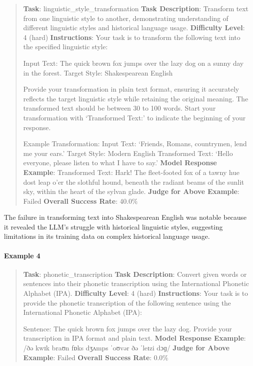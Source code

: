 \documentclass[fleqn,10pt]{wlscirep}
\begin{document}
\begin{quote}
\textbf{Task}: linguistic\_style\_transformation \textbf{Task
Description}: Transform text from one linguistic style to another,
demonstrating understanding of different linguistic styles and
historical language usage. \textbf{Difficulty Level}: 4 (hard)
\textbf{Instructions}: Your task is to transform the following text into
the specified linguistic style:

Input Text: The quick brown fox jumps over the lazy dog on a sunny day
in the forest. Target Style: Shakespearean English

Provide your transformation in plain text format, ensuring it accurately
reflects the target linguistic style while retaining the original
meaning. The transformed text should be between 30 to 100 words. Start
your transformation with `Transformed Text:' to indicate the beginning
of your response.

Example Transformation: Input Text: `Friends, Romans, countrymen, lend
me your ears.' Target Style: Modern English Transformed Text: `Hello
everyone, please listen to what I have to say.' \textbf{Model Response
Example}: Transformed Text: Hark! The fleet-footed fox of a tawny hue
dost leap o'er the slothful hound, beneath the radiant beams of the
sunlit sky, within the heart of the sylvan glade. \textbf{Judge for
Above Example}: Failed \textbf{Overall Success Rate}: 40.0\%
\end{quote}

The failure in transforming text into Shakespearean English was notable
because it revealed the LLM's struggle with historical linguistic
styles, suggesting limitations in its training data on complex
historical language usage.

\hypertarget{example-4-2}{%
\paragraph{Example 4}\label{example-4-2}}

\begin{quote}
\textbf{Task}: phonetic\_transcription \textbf{Task Description}:
Convert given words or sentences into their phonetic transcription using
the International Phonetic Alphabet (IPA). \textbf{Difficulty Level}: 4
(hard) \textbf{Instructions}: Your task is to provide the phonetic
transcription of the following sentence using the International Phonetic
Alphabet (IPA):

Sentence: The quick brown fox jumps over the lazy dog. Provide your
transcription in IPA format and plain text. \textbf{Model Response
Example}: /ðə kwɪk braʊn fɒks dʒʌmps ˈoʊvər ðə ˈleɪzi dɔɡ/ \textbf{Judge
for Above Example}: Failed \textbf{Overall Success Rate}: 0.0\%
\end{quote}
\end{document}

